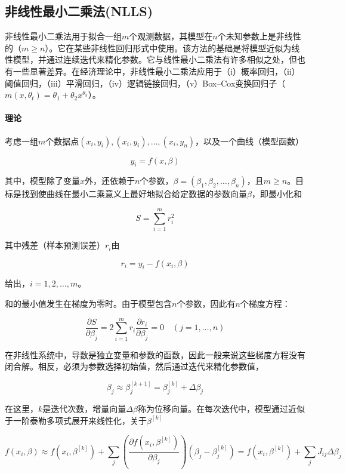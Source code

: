 \documentclass{ctexart}
\begin{document}
\subsection{非线性最小二乘法(NLLS)}


非线性最小二乘法用于拟合一组$m$个观测数据，其模型在$n$个未知参数上是非线性的（$m \geq n$）\cite{powell1964iterative}。它在某些非线性回归形式中使用。该方法的基础是将模型近似为线性模型，并通过连续迭代来精化参数\cite{kelley1999iterative}。它与线性最小二乘法有许多相似之处，但也有一些显著差异。在经济理论中，非线性最小二乘法应用于（i）概率回归，（ii）阈值回归，（iii）平滑回归，（iv）逻辑链接回归，（v）Box–Cox变换回归子（$m(x, \theta_t) = \theta_1 + \theta_2 x^{\theta_3}$）\cite{box1969nonlinear}。

\paragraph{理论}

考虑一组$m$个数据点$(x_i, y_i), (x_i, y_i), \ldots, (x_i, y_n)$，以及一个曲线（模型函数）\cite{strutz2016data}

\[ y_i = f(x, \beta) \]

其中，模型除了变量$x$外，还依赖于$n$个参数，$\beta = (\beta_1, \beta_2, \ldots, \beta_n)$，且$m \geq n$。目标是找到使曲线在最小二乘意义上最好地拟合给定数据的参数向量$\beta$，即最小化和

\[ S = \sum_{i=1}^m r_i^2 \]

其中残差（样本预测误差）$r_i$由

\[ r_i = y_i - f(x_i, \beta) \]

给出，$i = 1, 2, \ldots, m$。

和的最小值发生在梯度为零时。由于模型包含$n$个参数，因此有$n$个梯度方程：

\[ \frac{\partial S}{\partial \beta_j} = 2 \sum_{i=1}^m r_i \frac{\partial r_i}{\partial \beta_j} = 0 \quad (j = 1, \ldots, n) \]

在非线性系统中，导数是独立变量和参数的函数，因此一般来说这些梯度方程没有闭合解。相反，必须为参数选择初始值，然后通过迭代来精化参数值，

\[ \beta_j \approx \beta_j^{[k+1]} = \beta_j^{[k]} + \Delta \beta_j \]

在这里，$k$是迭代次数，增量向量$\Delta \beta$称为位移向量。在每次迭代中，模型通过近似于一阶泰勒多项式展开来线性化，关于$\beta^{[k]}$

\[ f(x_i, \beta) \approx f(x_i, \beta^{[k]}) + \sum_j \left( \frac{\partial f(x_i, \beta^{[k]})}{\partial \beta_j} \right) (\beta_j - \beta_j^{[k]}) = f(x_i, \beta^{[k]}) + \sum_j J_{ij} \Delta \beta_j \]
\end{document}
